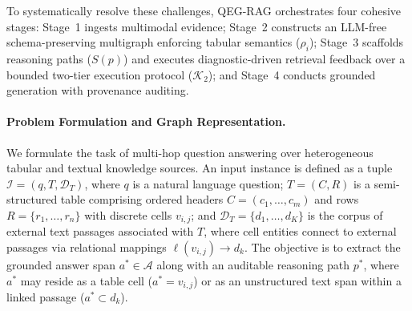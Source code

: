 \documentclass[runningheads]{llncs}
\begin{document}


To systematically resolve these challenges, QEG-RAG orchestrates four cohesive stages: Stage~1 ingests multimodal evidence; Stage~2 constructs an LLM-free schema-preserving multigraph enforcing tabular semantics ($\rho_i$); Stage~3 scaffolds reasoning paths ($S(p)$) and executes diagnostic-driven retrieval feedback over a bounded two-tier execution protocol ($\mathcal{K}_2$); and Stage~4 conducts grounded generation with provenance auditing.

\paragraph{Problem Formulation and Graph Representation.}
\label{sec:formulation}
We formulate the task of multi-hop question answering over heterogeneous tabular and textual knowledge sources. An input instance is defined as a tuple $\mathcal{I} = (q, T, \mathcal{D}_T)$, where $q$ is a natural language question; $T = (C, R)$ is a semi-structured table comprising ordered headers $C = (c_1, \dots, c_m)$ and rows $R = \{r_1, \dots, r_n\}$ with discrete cells $v_{i,j}$; and $\mathcal{D}_T = \{d_1, \dots, d_K\}$ is the corpus of external text passages associated with $T$, where cell entities connect to external passages via relational mappings $\ell(v_{i,j}) \rightarrow d_k$. The objective is to extract the grounded answer span $a^* \in \mathcal{A}$ along with an auditable reasoning path $p^*$, where $a^*$ may reside as a table cell ($a^* = v_{i,j}$) or as an unstructured text span within a linked passage ($a^* \subset d_k$).
\end{document}

